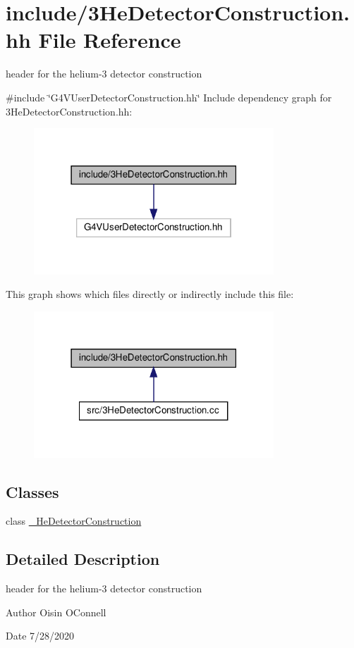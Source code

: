 \hypertarget{3HeDetectorConstruction_8hh}{}\section{include/3\+He\+Detector\+Construction.hh File Reference}
\label{3HeDetectorConstruction_8hh}


header for the helium-\/3 detector construction  


{\ttfamily \#include \char`\"{}G4\+V\+User\+Detector\+Construction.\+hh\char`\"{}}\newline
Include dependency graph for 3\+He\+Detector\+Construction.hh\+:
\nopagebreak
\begin{figure}[H]
\begin{center}
\leavevmode
\includegraphics[width=255pt]{3HeDetectorConstruction_8hh__incl}
\end{center}
\end{figure}
This graph shows which files directly or indirectly include this file\+:
\nopagebreak
\begin{figure}[H]
\begin{center}
\leavevmode
\includegraphics[width=255pt]{3HeDetectorConstruction_8hh__dep__incl}
\end{center}
\end{figure}
\subsection*{Classes}
\begin{DoxyCompactItemize}
\item 
class \hyperlink{class__3HeDetectorConstruction}{\+\_\+He\+Detector\+Construction}
\end{DoxyCompactItemize}


\subsection{Detailed Description}
header for the helium-\/3 detector construction 

\begin{DoxyAuthor}{Author}
Oisin O\textquotesingle{}Connell 
\end{DoxyAuthor}
\begin{DoxyDate}{Date}
7/28/2020 
\end{DoxyDate}
